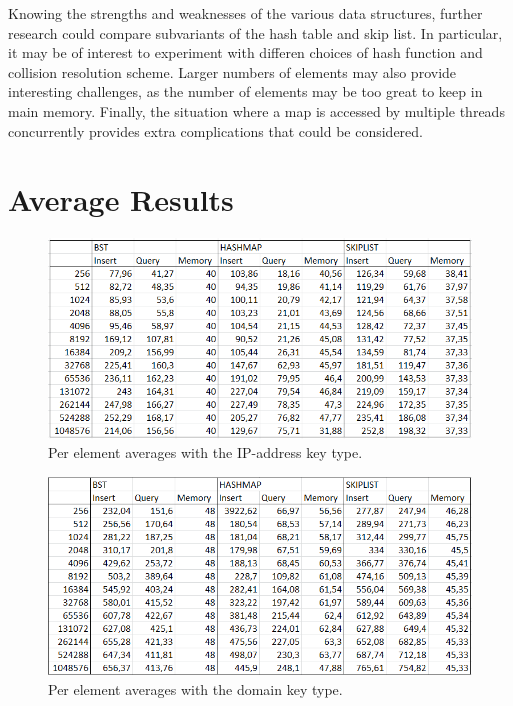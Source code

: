 \documentclass[12pt,a4paper]{article}
\begin{document}
    Knowing the strengths and weaknesses of the various data structures, further research could
    compare subvariants of the hash table and skip list.  In particular, it may be of interest to
    experiment with differen choices of hash function and collision resolution scheme.  Larger
    numbers of elements may also provide interesting challenges, as the number of elements may be
    too great to keep in main memory.  Finally, the situation where a map is accessed by multiple
    threads concurrently provides extra complications that could be considered.

    

    

    \newpage
    \appendix
    \section{Average Results} \label{App:AveResults}

    \begin{figure}[h!]
    \centering
    \includegraphics[width=\textwidth]{ip-address-averages.png}
    \caption{Per element averages with the IP-address key type.}
    \end{figure}

    \begin{figure}[h!]
    \centering
    \includegraphics[width=\textwidth]{domain-averages.png}
    \caption{Per element averages with the domain key type.}
    \end{figure}
\end{document}
